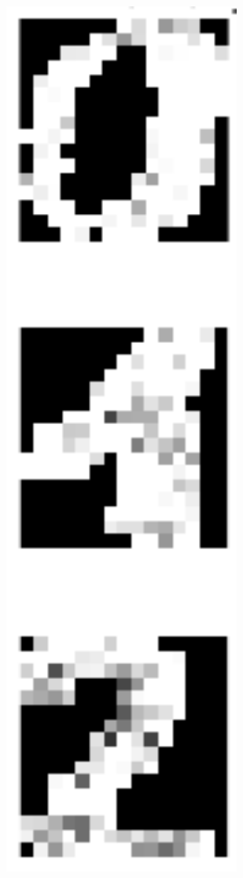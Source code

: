 \documentclass[pdftex,11pt,a4paper]{article}
\begin{document}
\begin{figure}[htb]
\begin{minipage}{0.08\textwidth}
\end{minipage}%
\begin{minipage}{0.08\textwidth}
\includegraphics[width=0.9\textwidth]{figs/partially_reconstructed.png}

\end{minipage}
\end{figure}
\end{document}
